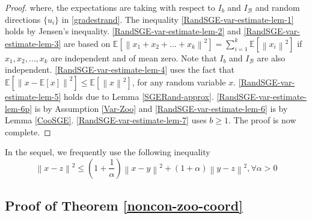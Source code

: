 \documentclass[iicol,sn-basic]{sn-jnl}
\theoremstyle{thmstyleone}%
\theoremstyle{thmstyletwo}%
\theoremstyle{thmstylethree}%
\newcommand*{\E}{\mathbb{E}}
\newcommand{\norm}[1]{\left\lVert#1\right\rVert}
\begin{document}
\begin{proof}
 where, the expectations are taking with respect to $I_b$ and $I_{\mathcal{B}}$ and random directions $\{u_i\}$ in \eqref{gradestrand}. The inequality \eqref{RandSGE-var-estimate-lem-1} holds by Jensen’s inequality. \eqref{RandSGE-var-estimate-lem-2} and \eqref{RandSGE-var-estimate-lem-3} are based on $\E[\norm{x_1+x_2+\ldots+x_k}^2] = \sum_{i=1}^k \E[\norm{x_i}^2]$ if $x_1,x_2,\ldots,x_k$ are independent and of mean zero. Note that $I_b$ and $I_{\mathcal{B}}$ are also independent. \eqref{RandSGE-var-estimate-lem-4} uses the fact that $\E[\norm{x-\E[x]}^2] \leq \E[\norm{x}^2]$, for any random variable $x$. \eqref{RandSGE-var-estimate-lem-5} holds due to Lemma \ref{SGERand-approx}. \eqref{RandSGE-var-estimate-lem-6p} is by Assumption \ref{Var-Zoo} and  \eqref{RandSGE-var-estimate-lem-6} is by Lemma \ref{CooSGE}. \eqref{RandSGE-var-estimate-lem-7} uses $b\geq 1$. The proof is now complete.
\end{proof}
In the sequel, we frequently use the following inequality
\begin{equation}\label{young}
\norm{x-z}^2 \leq (1+\frac{1}{\alpha})\norm{x-y}^2 + (1+\alpha) \norm{{y-z}}^2, \forall \alpha> 0
\end{equation}
\noindent\subsection{Proof of Theorem \ref{noncon-zoo-coord}}
\end{document}
